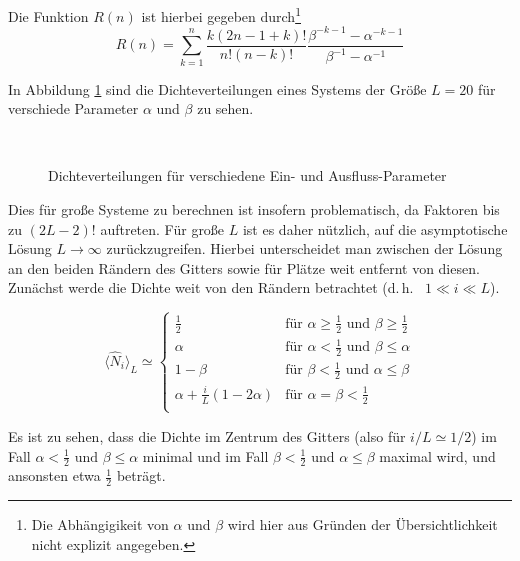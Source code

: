 \documentclass[10pt,a4paper]{report}
\begin{document}
Die Funktion $R(n)$ ist hierbei gegeben durch\footnote{Die Abhängigikeit von $\alpha$ und $\beta$ wird hier aus Gründen der Übersichtlichkeit nicht explizit angegeben.}
\begin{equation}
R(n)=\sum_{k=1}^{n}\frac{k(2n-1+k)!}{n!(n-k)!}\frac{\beta^{-k-1}-\alpha^{-k-1}}{\beta^{-1}-\alpha^{-1}}
\end{equation}

In Abbildung \ref{ASEP_density_img} sind die Dichteverteilungen eines Systems der Größe $L=20$ für verschiede Parameter $\alpha$ und $\beta$ zu sehen.

\begin{figure}
\centering
{}
\\
\caption{Dichteverteilungen für verschiedene Ein- und Ausfluss-Parameter}
\label{ASEP_density_img}
\end{figure}

Dies für große Systeme zu berechnen ist insofern problematisch, da Faktoren bis zu $(2L-2)!$ auftreten. Für große $L$ ist es daher nützlich, auf die asymptotische Lösung $L\rightarrow\infty$ zurückzugreifen. Hierbei unterscheidet man zwischen der Lösung an den beiden Rändern des Gitters sowie für Plätze weit entfernt von diesen. Zunächst werde die Dichte weit von den Rändern betrachtet (d.\,h.~ $1\ll i \ll L$).

\begin{equation}\label{density_equ}
\langle\hat{N}_i\rangle_L\simeq
\begin{cases}
\frac{1}{2}&\text{für }\alpha\geq\frac{1}{2}\text{ und }\beta\geq\frac{1}{2}\\
\alpha&\text{für }\alpha<\frac{1}{2}\text{ und }\beta\leq\alpha\\
1-\beta&\text{für }\beta<\frac{1}{2}\text{ und }\alpha\leq\beta\\
\alpha+\frac{i}{L}(1-2\alpha)&\text{für }\alpha=\beta<\frac{1}{2}\\
\end{cases}
\end{equation}

Es ist zu sehen, dass die Dichte im Zentrum des Gitters (also für $i/L\simeq 1/2$) im Fall $\alpha<\frac{1}{2}\text{ und }\beta\leq\alpha$ minimal und im Fall $\beta<\frac{1}{2}\text{ und }\alpha\leq\beta$ maximal wird, und ansonsten etwa $\frac{1}{2}$ beträgt.
\end{document}
